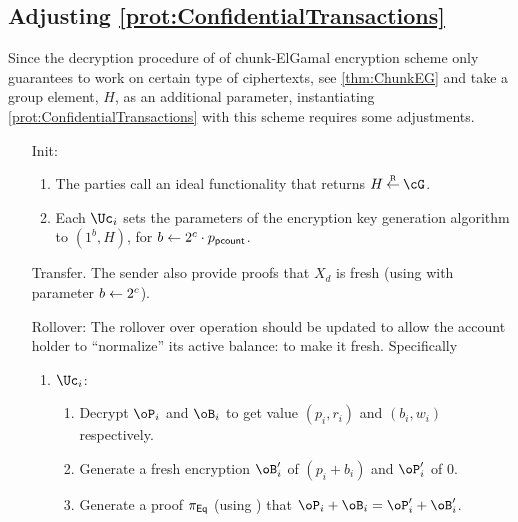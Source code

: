 \subsection{Adjusting  \cref{prot:ConfidentialTransactions}}\label{sec:ChanksEg:Adjusting}
Since the decryption procedure of of chunk-ElGamal  encryption scheme only guarantees to work on certain type of ciphertexts, see \cref{thm:ChunkEG} and take a group element, \ie $H$, as an additional parameter,  instantiating \cref{prot:ConfidentialTransactions} with this scheme  requires some adjustments.

\begin{enumerate}
	
	\item[Init:] 
	\begin{enumerate}
		\item The parties  call an ideal functionality that returns $H \getsr \cG$.
		  
		\item 	Each $\Uc_i$ sets the parameters of the encryption key generation algorithm to $(1^b,H)$, for  $b \leftarrow 2^{c}\cdot p_{\mathsf{pcount}}$.

	\end{enumerate}
 
	\item[Transfer.]  The sender also provide proofs that $X_d$ is fresh (\ie using \pZK{\rtFsh} with parameter $b\leftarrow 2^c$).
	
	
	\item[Rollover:] The rollover over operation should be updated to allow the account holder to ``normalize''  its active balance: to make it fresh. Specifically
	
	\begin{enumerate}
		\item $\Uc_i$:
		
		\begin{enumerate}
			\item Decrypt $\oP_i$ and $\oB_i$ to get value $(p_i,r_i)$ and $(b_i,w_i)$ respectively.
			
			
			\item Generate a fresh  encryption $\oB_i'$ of $(p_i +b_i )$ and $\oP_i'$ of $0$.
			
			\item Generate a proof $\pi_{\sf Eq}$ (\ie using \pZK{\rEq})   that $\oP_i+\oB_i = \oP_i'+ \oB_i'$.
			
			
			

\end{enumerate}
\end{enumerate}
\end{enumerate}

